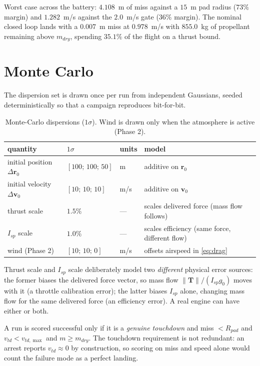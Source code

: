 \documentclass[11pt]{article}
\newcommand{\rvec}{\mathbf{r}}
\newcommand{\vvec}{\mathbf{v}}
\newcommand{\Tvec}{\mathbf{T}}
\begin{document}
Worst case across the battery: $4.108$~m of miss against a $15$~m pad radius
($73\%$ margin) and $1.282$~m/s against the $2.0$~m/s gate ($36\%$ margin).
The nominal closed loop lands with a $0.007$~m miss at $0.978$~m/s with
$855.0$~kg of propellant remaining above $m_{dry}$, spending $35.1\%$ of the
flight on a thrust bound.

\section{Monte Carlo}
\label{sec:mc}

The dispersion set is drawn once per run from independent Gaussians, seeded
deterministically so that a campaign reproduces bit-for-bit.

\begin{table}[htbp]
\centering
\caption{Monte-Carlo dispersions ($1\sigma$). Wind is drawn only when the
atmosphere is active (Phase 2).}
\label{tab:dispersions}
\begin{tabular}{llll}
\toprule
quantity & $1\sigma$ & units & model \\
\midrule
initial position $\Delta\rvec_0$ & $[100;\,100;\,50]$ & m & additive on $\rvec_0$ \\
initial velocity $\Delta\vvec_0$ & $[10;\,10;\,10]$ & m/s & additive on $\vvec_0$ \\
thrust scale                     & $1.5\%$ & --- & scales delivered force (mass flow follows) \\
$I_{sp}$ scale                   & $1.0\%$ & --- & scales efficiency (same force, different flow) \\
wind (Phase 2)                   & $[10;\,10;\,0]$ & m/s & offsets airspeed in \eqref{eq:drag} \\
\bottomrule
\end{tabular}
\end{table}

Thrust scale and $I_{sp}$ scale deliberately model two \emph{different}
physical error sources: the former biases the delivered force vector, so
mass flow $\lVert\Tvec\rVert/(I_{sp}g_0)$ moves with it (a throttle
calibration error); the latter biases $I_{sp}$ alone, changing mass flow for
the same delivered force (an efficiency error). A real engine can have
either or both.

A run is scored successful only if it is a \emph{genuine touchdown} and
miss $< R_{pad}$ and $v_{td} < v_{td,\max}$ and $m \ge m_{dry}$. The
touchdown requirement is not redundant: an arrest reports $v_{td}\approx 0$
by construction, so scoring on miss and speed alone would count the failure
mode as a perfect landing.
\end{document}
